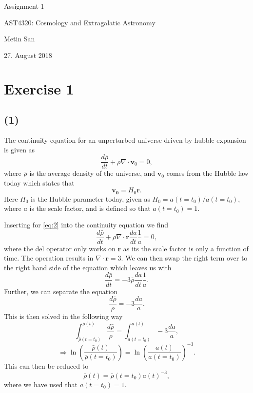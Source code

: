 \documentclass[a4paper,11.5pt,]{article}
\begin{document}
\vspace*{2cm}
\begin{center} 
 
\huge{Assignment 1}

\vspace{15mm}

\large{AST4320: Cosmology and Extragalatic Astronomy}

\vspace{5mm}

\normalsize{Metin San}

\vspace{5mm}

\normalsize{27. August 2018}

\vspace{25mm}

\end{center}

\newpage
\section*{Exercise 1}
\subsection*{(1)}

The continuity equation for an unperturbed universe driven by hubble expansion is given as 
\begin{equation}\label{eq:1}
\frac{d\bar{\rho}}{dt} + \bar{\rho} \nabla \cdot \mathbf{v}_0 = 0,
\end{equation}
where $\bar{\rho}$ is the average density of the universe, and $\mathbf{v}_0$ comes from the Hubble law today which states that 
\begin{equation}\label{eq:2}
\mathbf{v_0} = H_0 \mathbf{r}.
\end{equation}
Here $H_0$ is the Hubble parameter today, given as $H_0 = \dot{a}(t=t_0) / a(t = t_0)$, where $a$ is the scale factor, and is defined so that $a(t= t_0) = 1$. 

Inserting for \eqref{eq:2} into the continuity equation we find
\[
\frac{d\bar{\rho}}{dt} + \bar{\rho} \nabla \cdot \mathbf{r}  \frac{da}{dt} \frac{1}{a}= 0,
\]
where the del operator only works on $\mathbf{r}$ as its the scale factor is only a function of time. The operation results in $\nabla \cdot \mathbf{r} = 3$. We can then swap the right term over to the right hand side of the equation which leaves us with
\[
\frac{d\bar{\rho}}{dt}  = - 3\bar{\rho}\frac{da}{dt} \frac{1}{a}.
\]
Further, we can separate the equation
\[
\frac{d\bar{\rho}}{\rho} = -3 \frac{da}{a}.
\]
This is then solved in the following way
\[
\int_{\bar{\rho}(t=t_0)}^{\bar{\rho}(t)} \frac{d\bar{\rho}}{\rho} = \int_{a(t=t_0)}^{a(t)} -3 \frac{da}{a},
\]
\[
\Rightarrow \ln \left( \frac{\bar{\rho}(t)}{\bar{\rho}(t=t_0)}\right) = \ln \left( \frac{a(t)}{a(t=t_0)}\right)^{-3}.
\]
This can then be reduced to
\begin{equation}\label{eq:3}
\bar{\rho}(t) = \bar{\rho}(t=t_0)a(t)^{-3},
\end{equation}
where we have used that $a(t=t_0) = 1$.
\end{document}
